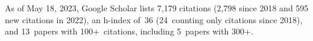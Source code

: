 %
As of May 18, 2023, Google Scholar lists
7,179 citations (2,798 since 2018 and 595 new citations in 2022),
an h-index of~36 (24~counting only citations since 2018),
and 13~papers with 100+~citations, including 5~papers with 300+.
